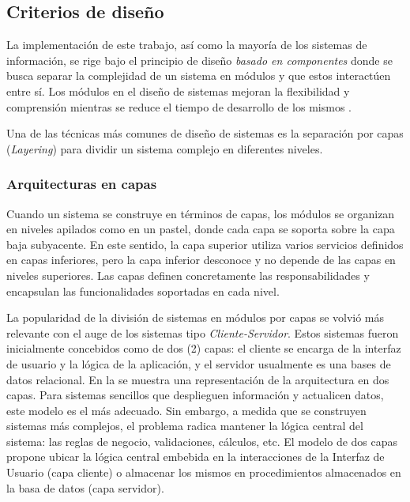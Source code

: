 \subsection{Criterios de diseño}

La implementación de este trabajo, así como la mayoría de los sistemas
de información, se rige bajo el principio de diseño \emph{basado en
componentes} donde se busca separar la complejidad de un sistema en
módulos y que estos interactúen entre sí. Los módulos en el diseño
de sistemas mejoran la flexibilidad y comprensión mientras se reduce
el tiempo de desarrollo de los mismos \cite{Parnas1972}.

Una de las técnicas más comunes de diseño de sistemas\emph{ }es la
separación por capas (\emph{Layering}) para dividir un sistema complejo
\cite{Fowler2002} en diferentes niveles. 

\subsubsection{Arquitecturas en capas}

Cuando un sistema se construye en términos de capas, los módulos se
organizan en niveles apilados como en un pastel, donde cada capa se
soporta sobre la capa baja subyacente. En este sentido, la capa superior
utiliza varios servicios definidos en capas inferiores, pero la capa
inferior desconoce y no depende de las capas en niveles superiores.
Las capas definen concretamente las responsabilidades y encapsulan
las funcionalidades soportadas en cada nivel.

La popularidad de la división de sistemas en módulos por capas se
volvió más relevante con el auge de los sistemas tipo \emph{Cliente-Servidor}.
Estos sistemas fueron inicialmente concebidos como de dos (2) capas:
el cliente se encarga de la interfaz de usuario y la lógica de la
aplicación, y el servidor usualmente es una bases de datos relacional.
En la  se muestra una representación
de la arquitectura en dos capas. Para sistemas sencillos que desplieguen
información y actualicen datos, este modelo es el más adecuado. Sin
embargo, a medida que se construyen sistemas más complejos, el problema
radica mantener la lógica central del sistema: las reglas de negocio,
validaciones, cálculos, etc. El modelo de dos capas propone ubicar
la lógica central embebida en la interacciones de la Interfaz de Usuario
(capa cliente) o almacenar los mismos en procedimientos almacenados
en la basa de datos (capa servidor).

